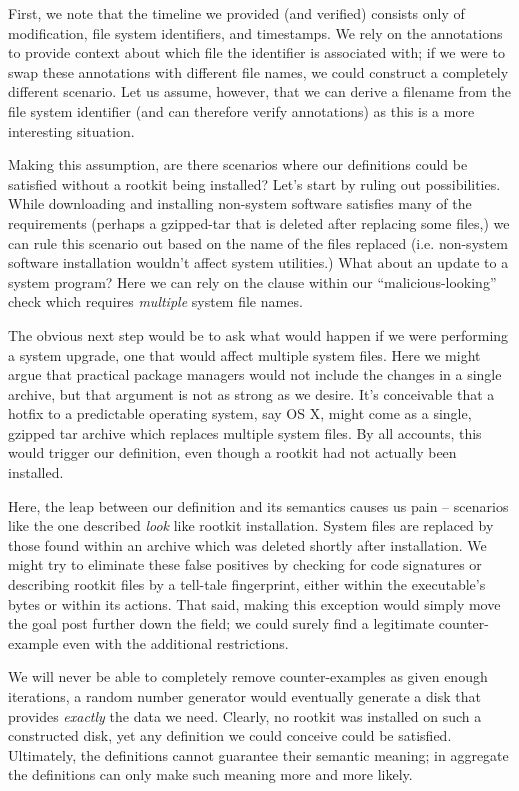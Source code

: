 \documentclass[nocopyrightspace]{sigplanconf}
\begin{document}
First, we note that the timeline we provided (and verified) consists only of
modification, file system identifiers, and timestamps. We rely on the
annotations to provide context about which file the identifier is associated
with; if we were to swap these annotations with different file names, we could
construct a completely different scenario. Let us assume, however, that we can
derive a filename from the file system identifier (and can therefore verify
annotations) as this is a more interesting situation.

Making this assumption, are there scenarios where our definitions could be
satisfied without a rootkit being installed? Let's start by ruling out
possibilities. While downloading and installing non-system software satisfies
many of the requirements (perhaps a gzipped-tar that is deleted after
replacing some files,) we can rule this scenario out based on the name of the
files replaced (i.e. non-system software installation wouldn't affect system
utilities.) What about an update to a system program? Here we can rely on the
clause within our ``malicious-looking'' check which requires {\em multiple}
system file names.

The obvious next step would be to ask what would happen if we were performing
a system upgrade, one that would affect multiple system files. Here we might
argue that practical package managers would not include the changes in a
single archive, but that argument is not as strong as we desire. It's
conceivable that a hotfix to a predictable operating system, say OS X, might
come as a single, gzipped tar archive which replaces multiple system files. By
all accounts, this would trigger our definition, even though a rootkit had
not actually been installed.

Here, the leap between our definition and its semantics causes us pain --
scenarios like the one described {\em look} like rootkit installation. System
files are replaced by those found within an archive which was deleted shortly
after installation. We might try to eliminate these false positives by
checking for code signatures or describing rootkit files by a tell-tale
fingerprint, either within the executable's bytes or within its actions. That
said, making this exception would simply move the goal post further down the
field; we could surely find a legitimate counter-example even with the
additional restrictions.

We will never be able to completely remove counter-examples as given enough
iterations, a random number generator would eventually generate a disk that
provides {\em exactly} the data we need. Clearly, no rootkit was installed on
such a constructed disk, yet any definition we could conceive could be
satisfied. Ultimately, the definitions cannot guarantee their semantic
meaning; in aggregate the definitions can only make such meaning more and more
likely.
\end{document}
